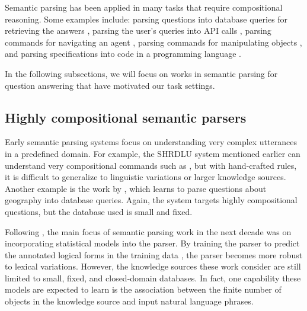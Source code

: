 Semantic parsing has been applied in many tasks
that require compositional reasoning.
Some examples include:
parsing questions into database queries for retrieving the answers
\cite{zelle96geoquery,zettlemoyer07relaxed,berant2013freebase,dong2016logical,zhong2017seq2sql},
parsing the user's queries into API calls
\cite{quirk2015language},
parsing commands for navigating an agent
\cite{chen11navigate,tellex2011understanding,artzi2013weakly,andreas2015alignment},
parsing commands for manipulating objects
\cite{guu2017bridging,fried2018unified},
and parsing specifications into code in a programming language
\cite{kushman2013regex,ling2016latent,yin2017syntactic,rabinovich2017abstract,iyer2018mapping}.

In the following subsections,
we will focus on works in semantic parsing for question answering
that have motivated our task settings.

\subsection{Highly compositional semantic parsers}

Early semantic parsing systems focus on
understanding very complex utterances in a
predefined domain.
For example, the
SHRDLU system \cite{winograd1972language}
mentioned earlier
can understand very compositional commands
such as
, but with hand-crafted rules,
it is difficult to generalize to linguistic variations
or larger knowledge sources.
Another example is the work by \citet{zelle96geoquery},
which learns to parse questions about geography
into database queries.
Again, the system targets highly compositional questions,
but the database used
is small and fixed.

Following \citet{zelle96geoquery},
the main focus of semantic parsing work
in the next decade
was on incorporating
statistical models into the parser.
By training the parser to predict the annotated logical forms
in the training data
\cite{kate07krisper,zettlemoyer07relaxed,kwiatkowski11lex},
the parser becomes more robust to lexical variations.
However, the knowledge sources these work consider
are still limited to small, fixed, and closed-domain databases.
In fact, one capability these models are expected to learn
is the association between the finite number
of objects in the knowledge source and 
input natural language phrases.

